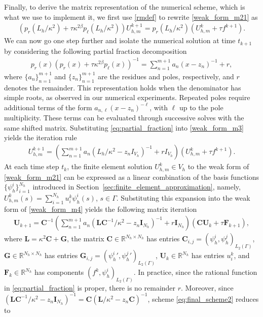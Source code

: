 \documentclass[numbers,webpdf]{ima-authoring-template}%
\theoremstyle{thmstyletwo}%
\numberwithin{equation}{section}
\begin{document}
Finally, to derive the matrix representation of the numerical scheme, which is what we use to implement it, we first use \eqref{rmdef} to rewrite \eqref{weak_form_m21} as
\begin{align}
\label{weak_form_m3}
        (p_r(L_h/\kappa^2)+\tau \kappa^{2\beta}p_\ell(L_h/\kappa^2))U_{h,m}^{k+1}= p_r(L_h/\kappa^2) (U_{h,m}^{k}+\tau f^{k+1}).
\end{align}
We can now go one step further and isolate the numerical solution at time $t_{k+1}$ by considering the following partial fraction decomposition 
\begin{align}
\label{eq:partial_fraction}
    p_r(x)(p_r(x)+\tau \kappa^{2\beta}p_\ell(x))^{-1} = \textstyle \sum_{n=1}^{m+1}a_n(x-z_n)^{-1} + r,
\end{align}
where $\{a_n\}_{n=1}^{m+1}$ and $\{z_n\}_{n=1}^{m+1}$ are the residues and poles, respectively, and $r$ denotes the remainder. This representation holds when the denominator has simple roots, as observed in our numerical experiments. Repeated poles require additional terms of the form $a_{n,\ell}(x-z_n)^{-\ell}$, with $\ell$ up to the pole multiplicity. These terms can be evaluated through successive solves with the same shifted matrix. Substituting \eqref{eq:partial_fraction} into \eqref{weak_form_m3} yields the iteration rule
\begin{align}
\label{weak_form_m4}
\textstyle
        U_{h,m}^{k+1}= \left(\sum_{n=1}^{m+1}a_n(L_h/\kappa^2-z_nI_{V_h})^{-1} + rI_{V_h}\right) (U_{h,m}^{k}+\tau f^{k+1}).
\end{align}
At each time step $t_k$, the finite element solution $U_{h,m}^k\in V_h$ to the weak form of \eqref{weak_form_m21} can be expressed as a linear combination of the basis functions  $\{\psi^i_h\}_{i=1}^{N_h}$ introduced in Section~\ref{sec:finite_element_approximation}, namely, $U_{h,m}^k(s) =  \sum_{i=1}^{N_h}u_i^k\psi^i_h(s)$, $s\in\Gamma$. Substituting this expansion into the weak form of \eqref{weak_form_m4} yields the following matrix iteration
\begin{align}
\label{eq:final_scheme2}
\textstyle
\mathbf{U}_{k+1} = \mathbf{C}^{-1}\left(\sum_{n=1}^{m+1} a_n\left(\mathbf{L}\mathbf{C}^{-1}/\kappa^2-z_n\mathbf{I}_{N_h}\right)^{-1} + r\mathbf{I}_{N_h}\right) (\mathbf{C}\mathbf{U}_k+\tau \mathbf{F}_{k+1}),
\end{align}
where $\mathbf{L} = \kappa^2\mathbf{C}+\mathbf{G}$, the matrix $\mathbf{C}\in\mathbb{R}^{N_h\times N_h}$ has entries $\mathbf{C}_{i,j} = (\psi^i_h,\psi^j_h)_{L_2(\Gamma)}$, $\mathbf{G}\in\mathbb{R}^{N_h\times N_h}$ has entries $\mathbf{G}_{i,j} = ({\psi^{i}_h}',{\psi^{j}_h}')_{L_2(\Gamma)}$, $\mathbf{U}_k\in\mathbb{R}^{N_h}$ has entries $u_i^k$, and $\mathbf{F}_k\in\mathbb{R}^{N_h}$ has components $(f^{k},\psi^i_h)_{L_2(\Gamma)}$. In practice, since the rational function in \eqref{eq:partial_fraction} is proper, there is no remainder $r$. Moreover, since $( \mathbf{L}\mathbf{C}^{-1}/\kappa^2-z_n\mathbf{I}_{N_h})^{-1}  = \mathbf{C}(\mathbf{L}/\kappa^2-z_n\mathbf{C})^{-1}$, scheme \eqref{eq:final_scheme2} reduces to
\end{document}
